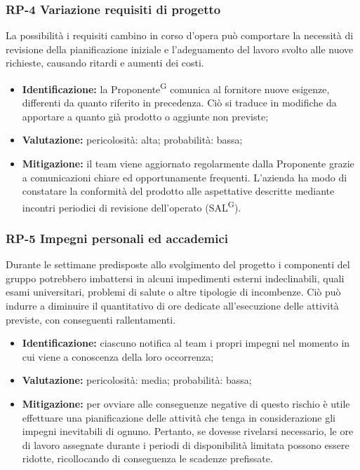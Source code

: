 \documentclass[8pt]{article}
\newcommand{\glossterm}[1]{#1\textsuperscript{G}} %
\begin{document}
\subsubsection{RP-4 Variazione requisiti di progetto}
La possibilità i requisiti cambino in corso d'opera può comportare la necessità di revisione della pianificazione iniziale e l'adeguamento del lavoro svolto alle nuove richieste, causando ritardi e aumenti dei costi.
\begin{itemize}
\setlength\itemsep{0em}
    \item \textbf{Identificazione:} la \glossterm{Proponente} comunica al fornitore nuove esigenze, differenti da quanto riferito in precedenza. Ciò si traduce in modifiche da apportare a quanto già prodotto o aggiunte non previste;
    \item \textbf{Valutazione:} pericolosità: alta; probabilità: bassa;
    \item \textbf{Mitigazione:} il team viene aggiornato regolarmente dalla Proponente grazie a comunicazioni chiare ed opportunamente frequenti. L'azienda ha modo di constatare la conformità del prodotto alle aspettative descritte mediante incontri periodici di revisione dell'operato (\glossterm{SAL}).
\end{itemize}

\subsubsection{RP-5 Impegni personali ed accademici}
Durante le settimane predisposte allo svolgimento del progetto i componenti del gruppo potrebbero imbattersi in alcuni impedimenti esterni indeclinabili, quali esami universitari, problemi di salute o altre tipologie di incombenze. 
Ciò può indurre a diminuire il quantitativo di ore dedicate all'esecuzione delle attività previste, con conseguenti rallentamenti.
\begin{itemize}
\setlength\itemsep{0em}
    \item \textbf{Identificazione:} ciascuno notifica al team i propri impegni nel momento in cui viene a conoscenza della loro occorrenza;
    \item \textbf{Valutazione:} pericolosità: media; probabilità: bassa;
    \item \textbf{Mitigazione:} per ovviare alle conseguenze negative di questo rischio è utile effettuare una pianificazione delle attività che tenga in considerazione gli impegni inevitabili di ognuno. Pertanto, se dovesse rivelarsi necessario, le ore di lavoro assegnate durante i periodi di disponibilità limitata possono essere ridotte, ricollocando di conseguenza le scadenze prefissate. 
\end{itemize}
\end{document}
